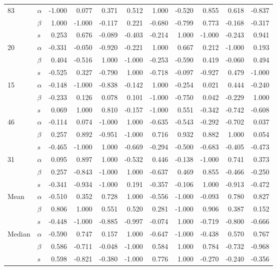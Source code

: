 \begin{table}
\begin{tabular}{llrrrrrrrrr}
\cline{1-11}
\multirow{3}{*}{83} & $\alpha$ & -1.000 &  0.077 &  0.371 &  0.512 &  1.000 & -0.520 &  0.855 &  0.618 & -0.837 \\
       & $\beta$ &  1.000 & -1.000 & -0.117 &  0.221 & -0.680 & -0.799 &  0.773 & -0.168 & -0.317 \\
       & $s$ &  0.253 &  0.676 & -0.089 & -0.403 & -0.214 &  1.000 & -1.000 & -0.243 &  0.941 \\
\cline{1-11}
\multirow{3}{*}{20} & $\alpha$ & -0.331 & -0.050 & -0.920 & -0.221 &  1.000 &  0.667 &  0.212 & -1.000 &  0.193 \\
       & $\beta$ &  0.404 & -0.516 &  1.000 & -1.000 & -0.253 & -0.590 &  0.419 & -0.060 &  0.494 \\
       & $s$ & -0.525 &  0.327 & -0.790 &  1.000 & -0.718 & -0.097 & -0.927 &  0.479 & -1.000 \\
\cline{1-11}
\multirow{3}{*}{15} & $\alpha$ & -0.148 & -1.000 & -0.838 & -0.142 &  1.000 & -0.254 &  0.021 &  0.444 & -0.240 \\
       & $\beta$ & -0.233 &  0.126 &  0.078 &  0.101 & -1.000 & -0.750 &  0.042 & -0.229 &  1.000 \\
       & $s$ &  0.069 &  1.000 &  0.810 & -0.157 & -1.000 &  0.551 & -0.342 & -0.742 & -0.608 \\
\cline{1-11}
\multirow{3}{*}{46} & $\alpha$ & -0.114 &  0.074 & -1.000 &  1.000 & -0.635 & -0.543 & -0.292 & -0.702 &  0.037 \\
       & $\beta$ &  0.257 &  0.892 & -0.951 & -1.000 &  0.716 &  0.932 &  0.882 &  1.000 &  0.054 \\
       & $s$ & -0.465 & -1.000 &  1.000 & -0.669 & -0.294 & -0.500 & -0.683 & -0.405 & -0.473 \\
\cline{1-11}
\multirow{3}{*}{31} & $\alpha$ &  0.095 &  0.897 &  1.000 & -0.532 &  0.446 & -0.138 & -1.000 &  0.741 &  0.373 \\
       & $\beta$ &  0.257 & -0.843 & -1.000 &  1.000 & -0.637 &  0.469 &  0.855 & -0.466 & -0.250 \\
       & $s$ & -0.341 & -0.934 & -1.000 &  0.191 & -0.357 & -0.106 &  1.000 & -0.913 & -0.472 \\
\cline{1-11}
\multirow{3}{*}{Mean} & $\alpha$ & -0.510 &  0.352 &  0.728 &  1.000 & -0.556 & -1.000 & -0.093 &  0.780 &  0.827 \\
       & $\beta$ &  0.806 &  1.000 &  0.551 &  0.520 &  0.281 & -1.000 &  0.906 &  0.387 &  0.152 \\
       & $s$ & -0.448 & -1.000 & -0.885 & -0.997 & -0.074 &  1.000 & -0.719 & -0.800 & -0.666 \\
\cline{1-11}
\multirow{3}{*}{Median} & $\alpha$ & -0.590 &  0.747 &  0.157 &  1.000 & -0.647 & -1.000 & -0.438 &  0.570 &  0.767 \\
       & $\beta$ &  0.586 & -0.711 & -0.048 & -1.000 &  0.584 &  1.000 &  0.784 & -0.732 & -0.968 \\
       & $s$ &  0.598 & -0.821 & -0.380 & -1.000 &  0.776 &  1.000 & -0.270 & -0.240 & -0.356 \\
\bottomrule
\end{tabular}
\end{table}
